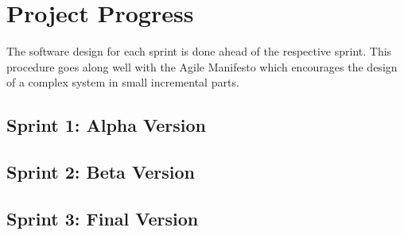 \chapter{Project Progress\label{ch:project_progress}}

The software design for each sprint is done ahead of the respective sprint.
This procedure goes along well with the Agile Manifesto which
encourages the design of a complex system in small incremental parts.


\section{Sprint 1: Alpha Version}


\section{Sprint 2: Beta Version}


\section{Sprint 3: Final Version}